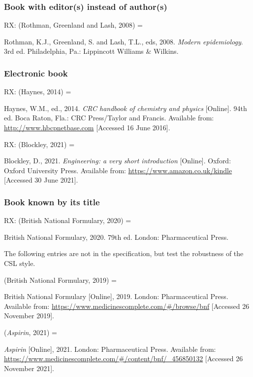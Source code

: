\subsubsection*{Book with editor(s) instead of author(s)}

RX: (Rothman, Greenland and Lash, 2008) = \cite{rothman.etal2008me}

Rothman, K.J., Greenland, S. and Lash, T.L., eds, 2008. \emph{Modern epidemiology}. 3rd ed. Philadelphia, Pa.: Lippincott Williams \& Wilkins.



\subsubsection*{Electronic book}

RX: (Haynes, 2014) = \cite{haynes2014crc}

Haynes, W.M., ed., 2014. \emph{CRC handbook of chemistry and physics} [Online]. 94th ed. Boca Raton, Fla.: CRC Press/Taylor and Francis. Available from: \url{http://www.hbcpnetbase.com} [Accessed 16 June 2016].


RX: (Blockley, 2021) = \cite{blockley2021evs}

Blockley, D., 2021. \emph{Engineering: a very short introduction} [Online]. Oxford: Oxford University Press. Available from: \url{https://www.amazon.co.uk/kindle} [Accessed 30 June 2021].



\subsubsection*{Book known by its title}

RX: (British National Formulary, 2020) = \cite{bnf2020}

British National Formulary, 2020. 79th ed. London: Pharmaceutical Press.


The following entries are not in the specification, but test the robustness of the CSL style.

(British National Formulary, 2019) = \cite{bnf2019online}

British National Formulary [Online], 2019. London: Pharmaceutical Press. Available from: \url{https://www.medicinescomplete.com/#/browse/bnf} [Accessed 26 November 2019].


(\emph{Aspirin}, 2021) = \cite{aspirin2021bnf}

\emph{Aspirin} [Online], 2021. London: Pharmaceutical Press. Available from: \url{https://www.medicinescomplete.com/#/content/bnf/_456850132} [Accessed 26 November 2021].


